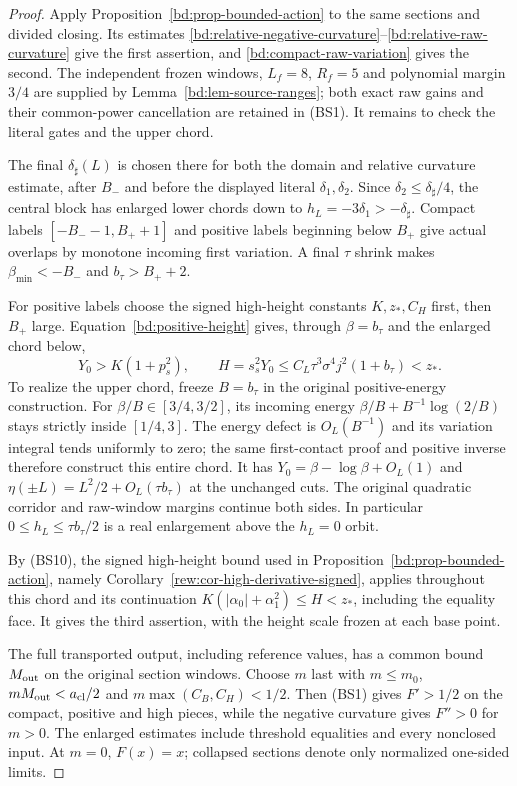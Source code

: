 \begin{proof}
Apply Proposition~\ref{bd:prop-bounded-action} to the same sections
and divided closing. Its estimates
\eqref{bd:relative-negative-curvature}--\eqref{bd:relative-raw-curvature}
give the first assertion, and \eqref{bd:compact-raw-variation}
gives the second.
The independent frozen windows, $L_f=8$, $R_f=5$ and polynomial
margin $3/4$ are supplied by Lemma~\ref{bd:lem-source-ranges};
both exact raw gains and their common-power cancellation are retained
in (BS1). It remains to check the literal gates and the upper chord.

The final $\delta_\sharp(L)$ is chosen there for both the domain and
relative curvature estimate, after $B_-$ and before the displayed literal
$\delta_1,\delta_2$. Since $\delta_2\le\delta_\sharp/4$,
the central block has enlarged lower chords down to
$h_L=-3\delta_1>-\delta_\sharp$. Compact labels
$[-B_--1,B_++1]$ and positive labels beginning below $B_+$ give actual
overlaps by monotone incoming first variation. A final $\tau$ shrink
makes $\beta_{\min}<-B_-$ and $b_\tau>B_++2$.

For positive labels choose the signed high-height constants
$K,z_*,C_H$ first, then $B_+$ large. Equation~\eqref{bd:positive-height}
gives, through $\beta=b_\tau$ and the enlarged chord below,
\[
 Y_0>K(1+p_s^2),\qquad
 H=s_s^2Y_0\le C_L\tau^3\sigma^4j^2(1+b_\tau)<z_*.
 \tag{BS10}
\]
To realize the upper chord, freeze $B=b_\tau$ in the original
positive-energy construction. For $\beta/B\in[3/4,3/2]$, its incoming
energy $\beta/B+B^{-1}\log(2/B)$ stays strictly inside $[1/4,3]$.
The energy defect is $O_L(B^{-1})$ and its variation integral tends
uniformly to zero; the same first-contact proof and positive inverse
therefore construct this entire chord. It has
$Y_0=\beta-\log\beta+O_L(1)$ and
$\eta(\pm L)=L^2/2+O_L(\tau b_\tau)$ at the unchanged cuts.
The original quadratic corridor and raw-window margins continue both
sides. In particular $0\le h_L\le\tau b_\tau/2$ is a real enlargement
above the $h_L=0$ orbit.

By (BS10), the signed high-height bound used in
Proposition~\ref{bd:prop-bounded-action}, namely
Corollary~\ref{rew:cor-high-derivative-signed}, applies throughout
this chord and its continuation
$K(|\alpha_0|+\alpha_1^2)\le H<z_*$, including the equality face.
It gives the third assertion, with the height scale frozen at each base point.

The full transported output, including reference values, has a common
bound $M_{\rm out}$ on the original section windows. Choose $m$ last
with $m\le m_0$, $mM_{\rm out}<a_{\rm cl}/2$ and
$m\max(C_B,C_H)<1/2$. Then (BS1) gives $F'>1/2$ on the compact,
positive and high pieces, while the negative curvature gives $F''>0$
for $m>0$. The enlarged estimates include threshold equalities and
every nonclosed input. At $m=0$, $F(x)=x$; collapsed sections denote
only normalized one-sided limits.
\end{proof}

